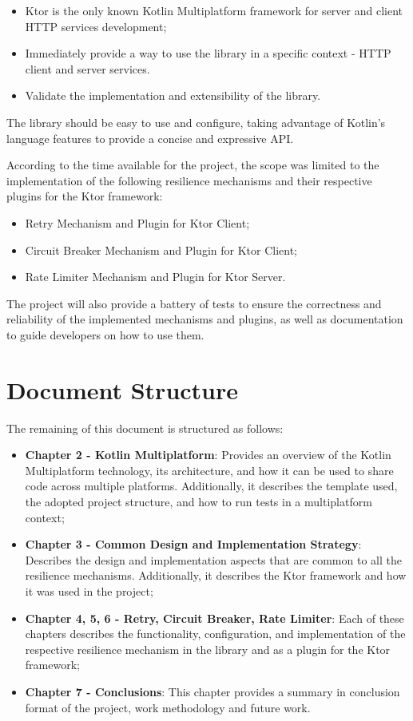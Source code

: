 \begin{itemize}
    \item Ktor is the only known Kotlin Multiplatform framework for server and client HTTP services development;
    \item Immediately provide a way to use the library in a specific context - HTTP client and server services.
    \item Validate the implementation and extensibility of the library.
\end{itemize}

The library should be easy to use and configure, taking advantage of Kotlin's language features to provide a concise and expressive API.

According to the time available for the project, the scope was limited to the implementation of the following resilience mechanisms and their respective plugins for the Ktor framework:

\begin{itemize}
    \item Retry Mechanism and Plugin for Ktor Client;
    \item Circuit Breaker Mechanism and Plugin for Ktor Client;
    \item Rate Limiter Mechanism and Plugin for Ktor Server.
\end{itemize}

The project will also provide a battery of tests
to ensure the correctness and reliability of the implemented mechanisms and plugins,
as well as documentation to guide developers on how to use them.


\section{Document Structure}\label{sec:document-structure}

The remaining of this document is structured as follows:

\begin{itemize}
    \item \textbf{Chapter 2 - Kotlin Multiplatform}: Provides an overview of the Kotlin Multiplatform technology, its architecture, and how it can be used to share code across multiple platforms.
    Additionally, it describes the template used, the adopted project structure, and how to run tests in a multiplatform context;
    \item \textbf{Chapter 3 - Common Design and Implementation Strategy}: Describes the design and implementation aspects that are common to all the resilience mechanisms.
    Additionally, it describes the Ktor framework and how it was used in the project;
    \item \textbf{Chapter 4, 5, 6 - Retry, Circuit Breaker, Rate Limiter}: Each of these chapters describes the functionality, configuration, and implementation of the respective resilience mechanism in the library and as a plugin for the Ktor framework;
    \item \textbf{Chapter 7 - Conclusions}: This chapter provides a summary in conclusion format of the project, work methodology and future work.
\end{itemize}
